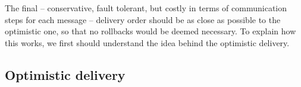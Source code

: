 \documentclass[times, 10pt]{article}
\begin{document}
The final -- conservative, fault tolerant, but costly in terms of communication steps for each message -- delivery order should be as close as possible to the optimistic one, so that no rollbacks would be deemed necessary. To explain how this works, we first should understand the idea behind the optimistic delivery.

\subsection{Optimistic delivery}



\end{document}

